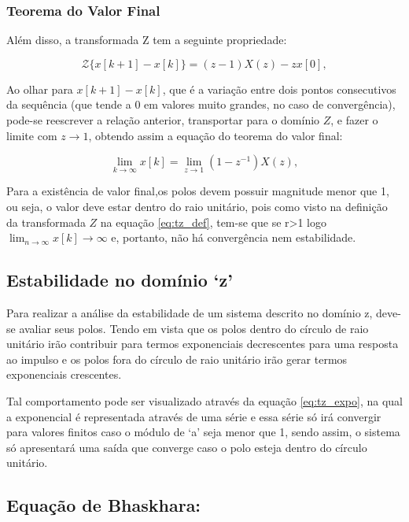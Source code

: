 \subsubsection{Teorema do Valor Final}

Além disso, a transformada Z tem a seguinte propriedade:

\begin{equation}
\mathcal{Z}\{x[k+1] - x[k]\} = (z - 1)X(z) - zx[0],
\label{eq:prop_zn_diff}
\end{equation}

Ao olhar para \( x[k+1] - x[k] \), que é a variação entre dois pontos consecutivos da sequência (que tende a 0 em valores muito grandes, no caso de convergência), pode-se reescrever a relação anterior, transportar para o domínio \( Z \), e fazer o limite com \( z \to 1 \), obtendo assim a equação do teorema do valor final:

\begin{equation}
\lim_{k \to \infty} x[k] = \lim_{z \to 1} (1-z^{-1})X(z),
\label{eq:valor_final}
\end{equation}


Para a existência de valor final,os polos devem possuir magnitude menor que 1, ou seja, o valor deve estar dentro do raio unitário, pois como visto na definição da transformada $Z$ na equação \ref{eq:tz_def}, tem-se que se r>1 logo $\lim_{n\to \infty} x[k] \to \infty$ e, portanto, não há convergência nem estabilidade.

\subsection{Estabilidade no domínio ‘z’}
\label{estabilidade}
Para realizar a análise da estabilidade de um sistema descrito no domínio z, deve-se avaliar seus polos. Tendo em vista que os polos dentro do círculo de raio unitário irão contribuir para termos exponenciais decrescentes para uma resposta ao impulso e os polos fora do círculo de raio unitário irão gerar termos exponenciais crescentes. 

Tal comportamento pode ser visualizado através da equação \ref{eq:tz_expo}, na qual a exponencial é representada através de uma série e essa série só irá convergir para valores finitos caso o módulo de ‘a’ seja menor que 1, sendo assim, o sistema só apresentará uma saída que converge caso o polo esteja dentro do círculo unitário.


\subsection{Equação de Bhaskhara:}

